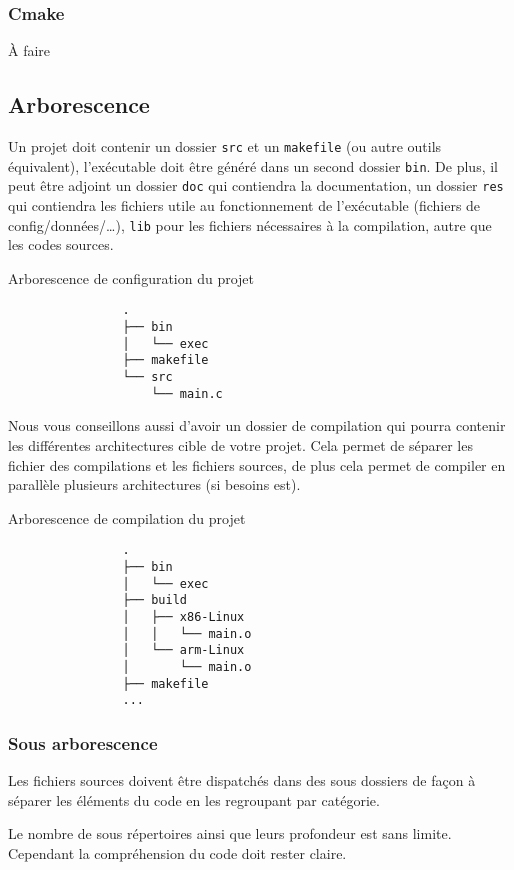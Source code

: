		\subsubsection{Cmake}
			À faire

	\subsection{Arborescence}
		Un projet doit contenir un dossier \verb+src+ et un \verb+makefile+ (ou autre outils équivalent), l'exécutable doit être généré dans un second dossier \verb+bin+. De plus, il peut être adjoint un dossier \verb+doc+ qui contiendra la documentation, un dossier \verb+res+ qui contiendra les fichiers utile au fonctionnement de l’exécutable (fichiers de config/données/\dots), \verb+lib+ pour les fichiers nécessaires à la compilation, autre que les codes sources.

		\begin{cbox}{Arborescence de configuration du projet}
			\begin{verbatim}
				.
				├── bin
				│   └── exec
				├── makefile
				└── src
				    └── main.c
			\end{verbatim}
		\end{cbox}

		Nous vous conseillons aussi d'avoir un dossier de compilation qui pourra contenir les différentes architectures cible de votre projet. Cela permet de séparer les fichier des compilations et les fichiers sources, de plus cela permet de compiler en parallèle plusieurs architectures (si besoins est).

		\begin{cbox}{Arborescence de compilation du projet}
			\begin{verbatim}
				.
				├── bin
				│   └── exec
				├── build
				│   ├── x86-Linux
				│   │   └── main.o
				│   └── arm-Linux
				│       └── main.o
				├── makefile
				...
			\end{verbatim}
		\end{cbox}
		
		\subsubsection{Sous arborescence}
			Les fichiers sources doivent être dispatchés dans des sous dossiers de façon à séparer les éléments du code en les regroupant par catégorie.

			Le nombre de sous répertoires ainsi que leurs profondeur est sans limite. Cependant la compréhension du code doit rester claire.

